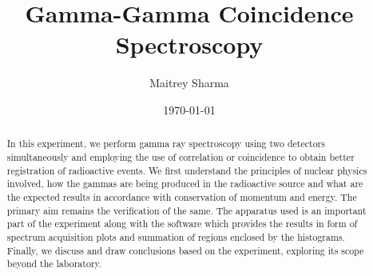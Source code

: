 \documentclass[%
 reprint,
nofootinbib,
 amsmath,amssymb,
 aps,
floatfix,
]{revtex4-2}
\begin{document}

\title{Gamma-Gamma Coincidence Spectroscopy}%


\author{Maitrey Sharma}




\date{\today}%

\begin{abstract}
    In this experiment, we perform gamma ray spectroscopy using two detectors simultaneously and employing the use of correlation or coincidence to obtain better registration of radioactive events. We first understand the principles of nuclear physics involved, how the gammas are being produced in the radioactive source and what are the expected results in accordance with conservation of momentum and energy. The primary aim remains the verification of the same. The apparatus used is an important part of the experiment along with the software which provides the results in form of spectrum acquisition plots and summation of regions enclosed by the histograms. Finally, we discuss and draw conclusions based on the experiment, exploring its scope beyond the laboratory.
\end{abstract}

\keywords{}
\maketitle

\end{document}
